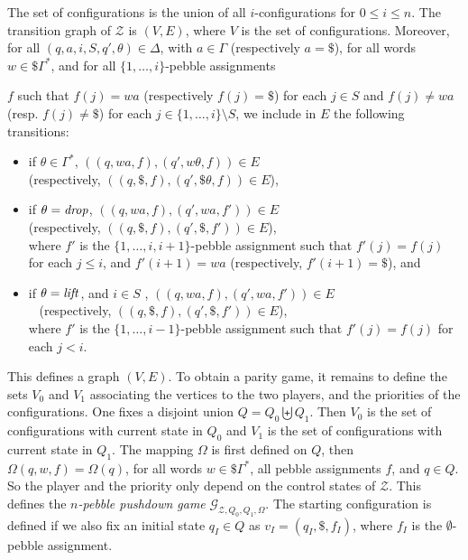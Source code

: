 \documentclass[a4paper,UKenglish,cleveref, autoref, thm-restate]{lipics-v2021}
\begin{document}
The set of configurations is the union of all $i$-configurations for $0 \leq i \leq n$. The transition graph of $\mathcal{Z}$ is $(V,E)$, where $V$ is the set of configurations. %
Moreover, 
for all $(q, a, i, S, q', \theta) \in \Delta$, with $a \in \Gamma$ (respectively $ \! a = \$ $),
 for all words $w \in \$ \Gamma^*$, and for all $\{ 1, \ldots , i \}$-pebble assignments 
 
 \begin{samepage}
\noindent
 $f$ such that $f(j) = wa$ (respectively $f(j)= \$ $) for each
$j \in S$ 	and
 $f(j) \neq wa$ (resp. $f(j) \neq \$ $) for each $j \in \{ 1, \ldots , i \} \setminus S$,
we include in $E$ the following transitions:
\begin{itemize}
\item if $\theta \in \Gamma^*$, 
$((q,wa,f), (q',w\theta, f)) \in E $ \\
(respectively, $((q,\$,f), (q',\$\theta, f)) \in E $),
\item if $ \theta = \text{\textit{drop}}$, 
$((q,wa,f), (q',wa, f')) \in E $  \\
(respectively, $((q,\$,f), (q',\$, f')) \in E $),\\
where $f'$ is the $\{ 1, \ldots , i, i+1 \}$-pebble assignment such that
$f'(j) = f(j)$ for each
$j \leq i$, and $f'(i+1) = wa$ (respectively, $f'(i+1) = \$$), and
\item if $\theta = \text{\textit{lift}}$, and $ i \in S $%
, 
$((q,wa,f), (q',wa, f')) \in E $ \\ 
(respectively, $((q,\$,f), (q',\$, f')) \in E $),\\
where $f'$ is the $\{ 1, \ldots , i - 1 \}$-pebble assignment such that
$f'(j) = f(j)$ for each
$j < i$.
\end{itemize}
\end{samepage}


This defines a graph  $(V,E) $. 
%
To obtain
a parity game, it remains to define the sets $V_0$ and $V_1$ associating the vertices
to the two players, and the priorities of the configurations. One fixes a disjoint
union
 $Q = Q_0  \biguplus Q_1 $. Then 
 $V_0$ is the set of configurations with current state in $Q_0$ and 
 $V_1$ is the set of configurations with current state in $Q_1$.
The mapping  $\Omega$ is first
defined on $Q$, then  $\Omega (q,w,f) =  \Omega (q)$,  for all words $ w  \in \$ \Gamma^*$, all pebble assignments $f$, and 
$q  \in  Q$. So the player and the
priority only depend on the control states of $\mathcal{Z}$. 
This defines the {\em $n$-pebble pushdown game} $ \mathcal{G}_{\mathcal{Z}, Q_0,Q_1,\Omega}$.
The starting configuration is defined if we also fix an initial state 
$q_I  \in  Q$ as $v_I = (q_I, \$, f_I)$, where $f_I$ is the $\emptyset$-pebble assignment. \newline
\end{document}
